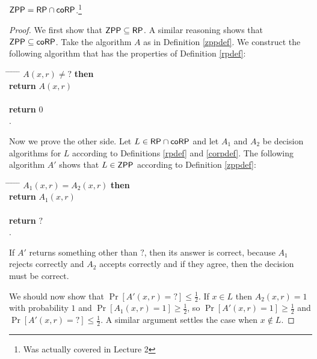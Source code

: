 \begin{proposition} $\mathsf{ZPP} = \mathsf{RP} \cap \mathsf{coRP}$.\footnote{Was actually covered in Lecture 2}
\end{proposition}
\begin{proof}
We first show that $\mathsf{ZPP} \subseteq \mathsf{RP}$. A similar reasoning shows that $\mathsf{ZPP} \subseteq \mathsf{coRP}$. Take the algorithm $A$ as in Definition \ref{zppdef}. We construct the following algorithm that has the properties of Definition \ref{rpdef}:

\begin{tabbing}
\hspace*{.25in} \= \hspace*{.25in} \= \hspace*{.25in} \= \hspace*{.25in} \= \hspace*{.25in} \=\kill
{} $A(x, r) \neq ?$ {\bf then } \\
\>\> {\bf return} $A(x, r)$ \\
 \\
\>\> {\bf return} $0$\\
 .
\end{tabbing}

Now we prove the other side. Let $L \in \mathsf{RP} \cap \mathsf{coRP}$ and let $A_1$ and $A_2$ be decision algorithms for $L$ according to Definitions \ref{rpdef} and \ref{corpdef}. The following algorithm $A'$ shows that $L \in \mathsf{ZPP}$ according to Definition \ref{zppdef}:

\begin{tabbing}
\hspace*{.25in} \= \hspace*{.25in} \= \hspace*{.25in} \= \hspace*{.25in} \= \hspace*{.25in} \=\kill
{} $A_1(x, r) = A_2(x, r)$ {\bf then } \\
\>\> {\bf return} $A_1(x, r)$ \\
 \\
\>\> {\bf return} $?$\\
 .
\end{tabbing}

If $A'$ returns something other than $?$, then its answer is correct, because $A_1$ rejects correctly and $A_2$ accepts correctly and if they agree, then the decision must be correct.

We should now show that $\Pr[A'(x, r) = ?] \leq \frac{1}{2}$. If $x \in L$ then $A_2(x, r) = 1$ with probability $1$ and $\Pr[A_1(x, r) = 1] \geq \frac{1}{2}$, so $\Pr[A'(x, r) = 1] \geq \frac{1}{2}$ and $\Pr[A'(x, r) = ?] \leq \frac{1}{2}$. A similar argument settles the case when $x \not \in L$. 
\end{proof}

